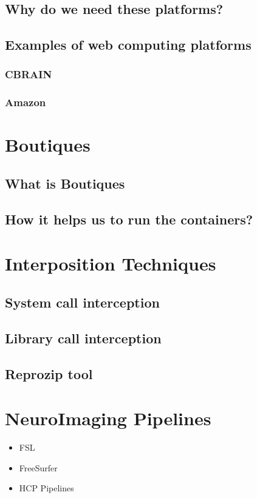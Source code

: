 \subsection{Why do we need these platforms?}
\subsection{Examples of web computing platforms}
\subsubsection{CBRAIN}
\subsubsection{Amazon}

\section{Boutiques}
\subsection{What is Boutiques}
\subsection{How it helps us to run the containers?}

\section{Interposition Techniques}
\subsection{System call interception}
\subsection{Library call interception}
\subsection{Reprozip tool}

\section{NeuroImaging Pipelines}
\begin{itemize}
 \item FSL
 \item FreeSurfer
 \item HCP Pipelines
\end{itemize}


